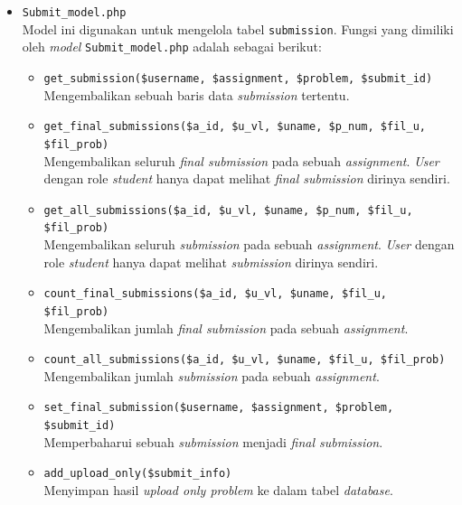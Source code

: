 \documentclass[a4paper,twoside]{article}
\begin{document}
\begin{enumerate}
\begin{itemize}
\begin{itemize}
			            \item \verb|Submit_model.php| \\
			                  Model ini digunakan untuk mengelola tabel \verb|submission|. Fungsi yang dimiliki oleh \textit{model} \verb|Submit_model.php| adalah sebagai berikut:

			                  \begin{itemize}
				                  \item \verb|get_submission($username, $assignment, $problem, $submit_id)| \\
				                        Mengembalikan sebuah baris data \textit{submission} tertentu.
				                  \item \verb|get_final_submissions($a_id, $u_vl, $uname, $p_num, $fil_u, $fil_prob)| \\
				                        Mengembalikan seluruh \textit{final submission} pada sebuah \textit{assignment}. \textit{User} dengan role \textit{student} hanya dapat melihat \textit{final submission} dirinya sendiri.
				                  \item \verb|get_all_submissions($a_id, $u_vl, $uname, $p_num, $fil_u, $fil_prob)| \\
				                        Mengembalikan seluruh \textit{submission} pada sebuah \textit{assignment}. \textit{User} dengan role \textit{student} hanya dapat melihat \textit{submission} dirinya sendiri.
				                  \item \verb|count_final_submissions($a_id, $u_vl, $uname, $fil_u, $fil_prob)| \\
				                        Mengembalikan jumlah \textit{final submission} pada sebuah \textit{assignment}.
				                  \item \verb|count_all_submissions($a_id, $u_vl, $uname, $fil_u, $fil_prob)| \\
				                        Mengembalikan jumlah \textit{submission} pada sebuah \textit{assignment}.
				                  \item \verb|set_final_submission($username, $assignment, $problem, $submit_id)| \\
				                        Memperbaharui sebuah \textit{submission} menjadi \textit{final submission}.
				                  \item \verb|add_upload_only($submit_info)| \\
				                        Menyimpan hasil \textit{upload only problem} ke dalam tabel \textit{database}.
			                  \end{itemize}


\end{itemize}
\end{itemize}
\end{enumerate}
\end{document}
